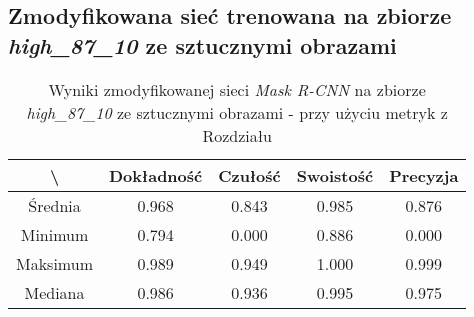 \subsection{Zmodyfikowana sieć trenowana na zbiorze \textit{high\_87\_10} ze sztucznymi obrazami}

\begin{table}[H]
	\centering
	\caption{Wyniki zmodyfikowanej sieci \textit{Mask R-CNN} na zbiorze \textit{high\_87\_10} ze sztucznymi obrazami - przy użyciu metryk z Rozdziału }
	\vspace{6pt}
	{\footnotesize
		\begin{tabular}{|c|c|c|c|c|}
      \hline \textbackslash & Dokładność & Czułość & Swoistość & Precyzja \\
      \hline Średnia & 0.968 & 0.843 & 0.985 & 0.876 \\
      \hline Minimum & 0.794 & 0.000 & 0.886 & 0.000 \\
      \hline Maksimum & 0.989 & 0.949 & 1.000 & 0.999 \\
      \hline Mediana & 0.986 & 0.936 & 0.995 & 0.975 \\
      \hline
		\end{tabular}
	}
  \vspace{0pt}
  \label{Tab:high_modified_generated_calculated}
\end{table}


